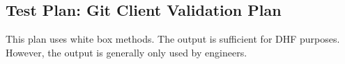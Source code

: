 \subsection{Test Plan: Git Client Validation Plan}
\begin{description}[align=right,leftmargin=3.2cm,labelindent=3.0cm]
\item[Purpose:] This plan uses white box methods.  The output is sufficient for DHF purposes.  However, the output is generally only used by engineers.
\end{description}
